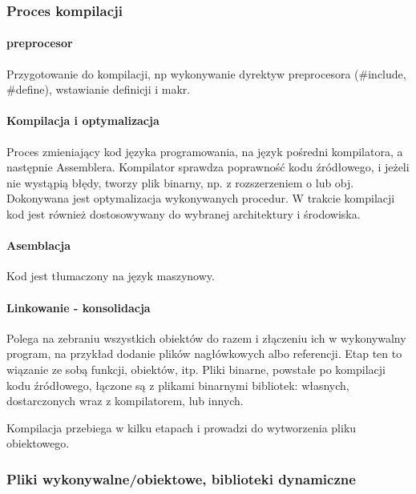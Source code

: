 \documentclass[a4paper,twoside]{report}
\begin{document}
\subsubsection{Proces kompilacji}
\paragraph{preprocesor}
Przygotowanie do kompilacji, np wykonywanie dyrektyw preprocesora (\#include, \#define), wstawianie definicji i makr.

\paragraph{Kompilacja i optymalizacja}

Proces zmieniający kod języka programowania, na język pośredni kompilatora, a następnie Assemblera. Kompilator sprawdza poprawność kodu źródłowego, i jeżeli nie wystąpią błędy, tworzy plik binarny, np. z rozszerzeniem o lub obj.  Dokonywana jest optymalizacja wykonywanych procedur. W trakcie kompilacji kod jest również dostosowywany do wybranej architektury i środowiska. 

\paragraph{Asemblacja}

Kod jest tłumaczony na język maszynowy.

\paragraph{Linkowanie - konsolidacja}

Polega na zebraniu wszystkich obiektów do razem i złączeniu ich w wykonywalny program, na przykład dodanie plików nagłówkowych albo referencji. Etap ten to wiązanie ze sobą funkcji, obiektów, itp. Pliki binarne, powstałe po kompilacji kodu źródłowego, łączone są z plikami binarnymi bibliotek: własnych, dostarczonych wraz z kompilatorem, lub innych.

Kompilacja przebiega w kilku etapach i prowadzi do wytworzenia pliku obiektowego.

\subsubsection{Pliki wykonywalne/obiektowe, biblioteki dynamiczne}
\end{document}
